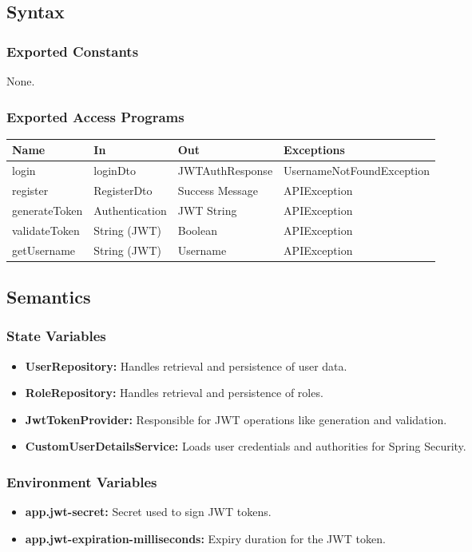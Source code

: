 \documentclass[12pt, titlepage]{article}
\begin{document}
\subsection{Syntax}

\subsubsection{Exported Constants}
None.

\subsubsection{Exported Access Programs}
\begin{tabular}{| l | l | l | l |}
\hline
\textbf{Name} & \textbf{In} & \textbf{Out} & \textbf{Exceptions} \\
\hline
login & loginDto & JWTAuthResponse & UsernameNotFoundException \\
register & RegisterDto & Success Message & APIException \\
generateToken & Authentication & JWT String & APIException \\
validateToken & String (JWT) & Boolean & APIException \\
getUsername & String (JWT) & Username & APIException \\
\hline
\end{tabular}

\subsection{Semantics}

\subsubsection{State Variables}
\begin{itemize}
    \item \textbf{UserRepository:} Handles retrieval and persistence of user data.
    \item \textbf{RoleRepository:} Handles retrieval and persistence of roles.
    \item \textbf{JwtTokenProvider:} Responsible for JWT operations like generation and validation.
    \item \textbf{CustomUserDetailsService:} Loads user credentials and authorities for Spring Security.
\end{itemize}

\subsubsection{Environment Variables}
\begin{itemize}
    \item \textbf{app.jwt-secret:} Secret used to sign JWT tokens.
    \item \textbf{app.jwt-expiration-milliseconds:} Expiry duration for the JWT token.
\end{itemize}
\end{document}

